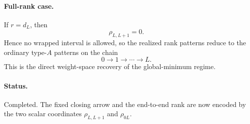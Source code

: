 \paragraph{Full-rank case.}
If \(r=d_L\), then
\[
\rho_{L,L+1}=0.
\]
Hence no wrapped interval is allowed, so the realized rank patterns reduce to
the ordinary type-\(A\) patterns on the chain
\[
0\to 1\to \cdots \to L.
\]
This is the direct weight-space recovery of the global-minimum regime.

\paragraph{Status.}
Completed. The fixed closing arrow and the end-to-end rank are now encoded by
the two scalar coordinates \(\rho_{L,L+1}\) and \(\rho_{0L}\).
